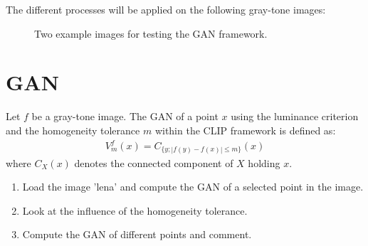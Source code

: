\noindent The different processes will be applied on the following gray-tone images:
\begin{figure}[htbp]
\centering\caption{Two example images for testing the GAN framework.}
\hfill
{}
\label{fig:ganip:examples}
\end{figure}


\section{GAN}
Let $f$ be a gray-tone image. The GAN of a point $x$ using the luminance criterion and the homogeneity tolerance $m$ within the CLIP framework is defined as:
\begin{eqnarray}
V_m^f(x)=C_{\{y; |f(y)-f(x)|\leq m\}}(x)
\end{eqnarray}
where $C_X(x)$ denotes the connected component of $X$ holding $x$.
\begin{qbox}
\begin{enumerate}
	\item Load the image 'lena' and compute the GAN of a selected point in the image.
	\item Look at the influence of the homogeneity tolerance.
	\item Compute the GAN of different points and comment.
\end{enumerate}
\end{qbox}


